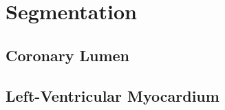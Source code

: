 \section{Segmentation}
\label{sec:method-segmentation}

\subsection{Coronary Lumen}
\label{sec:method-lumen}

\subsection{Left-Ventricular Myocardium}
\label{sec:method-myocardium}
